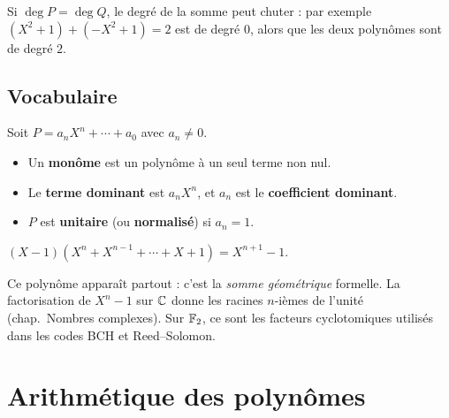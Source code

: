 \begin{rembox}
Si $\deg P = \deg Q$, le degré de la somme peut chuter : par exemple $(X^2 + 1) + (-X^2 + 1) = 2$ est de degré $0$, alors que les deux polynômes sont de degré $2$.
\end{rembox}

\subsection{Vocabulaire}

\begin{defbox}[--- Vocabulaire]
Soit $P = a_n X^n + \cdots + a_0$ avec $a_n \neq 0$.
\begin{itemize}[leftmargin=1cm]
  \item Un \textbf{monôme} est un polynôme à un seul terme non nul.
  \item Le \textbf{terme dominant} est $a_n X^n$, et $a_n$ est le \textbf{coefficient dominant}.
  \item $P$ est \textbf{unitaire} (ou \textbf{normalisé}) si $a_n = 1$.
\end{itemize}
\end{defbox}

\begin{exbox}
$(X - 1)(X^n + X^{n-1} + \cdots + X + 1) = X^{n+1} - 1$.

Ce polynôme apparaît partout : c'est la \emph{somme géométrique} formelle. La factorisation de $X^n - 1$ sur $\mathbb{C}$ donne les racines $n$-ièmes de l'unité (chap.~Nombres complexes). Sur $\mathbb{F}_2$, ce sont les facteurs cyclotomiques utilisés dans les codes BCH et Reed--Solomon.
\end{exbox}


\section{Arithmétique des polynômes}

